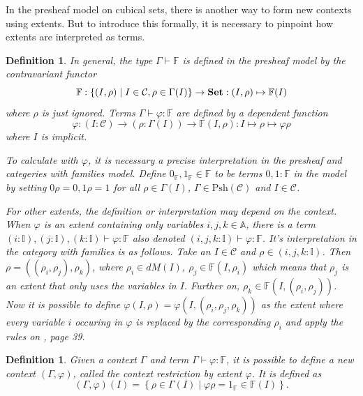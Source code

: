 \documentclass[12pt,a4paper,twoside,xetex]{book}
\newcommand{\keyword}[1]{\emph{#1}\index{#1}}
\newtheorem{definition}[theorem]{Definition}
\newcommand{\Psh}[1]{\text{Psh}\left(#1\right)}
\begin{document}
In the presheaf model on cubical sets, there is another way to form new 
contexts using extents. But to introduce this formally, it is necessary to 
pinpoint how extents are interpreted as terms.

\begin{definition}
In general, the type $\Gamma \vdash \mathbb{F}$ is defined in the presheaf 
model by the contravariant functor $$\mathbb{F} : \left\{ (I, \rho) \mid  I \in 
\mathcal{C},  \rho \in \Gamma (I) \right\} \rightarrow \text{\textbf{Set}}: (I, \rho) \mapsto 
\mathbb{F}(I)$$ where $\rho$ is just ignored. Terms $\Gamma \vdash \varphi : 
\mathbb{F}$ are defined by a dependent function $$\varphi : (I : \mathcal{C}) 
\rightarrow (\rho : \Gamma (I)) \rightarrow  \mathbb{F}(I,\rho): I \mapsto \rho 
\mapsto \varphi \rho $$ where $I$ is implicit.

To calculate with $\varphi$, it is necessary a precise interpretation in the 
presheaf and categeries with families model. Define $ 0_{\mathbb{F}}, 
1_{\mathbb{F}} \in \mathbb{F}$ to be terms $0,1 : \mathbb{F}$ in the model by 
setting \(0 \rho = 0, 1 \rho = 1\) for all $\rho \in \Gamma (I)$, $\Gamma \in 
\Psh{\mathcal{C}}$ and $I \in \mathcal{C}$.  

For other extents, the definition or interpretation may depend on the context. 
When $\varphi$ is an extent containing only variables $i,j,k \in \mathbb{A}$, 
there is a term $(i: \mathbb{I}), (j: \mathbb{I}), (k: \mathbb{I}) \vdash 
\varphi : \mathbb{F}$ also denoted $(i,j,k: \mathbb{I}) \vdash \varphi : 
\mathbb{F}$. It's interpretation in the category with families is as follows. 
Take an $I \in \mathcal{C}$ and  $\rho \in (i,j,k: \mathbb{I})$. Then $\rho = 
((\rho_i, \rho_j), \rho_k)$, where $\rho_i \in dM(I)$, $\rho_j \in 
\mathbb{F}(I,\rho_i)$ which means that $\rho_j$ is an extent that only uses the 
variables in $I$. Further on, $\rho_k \in \mathbb{F}(I, (\rho_i, \rho_j))$. Now 
it is possible to define $\varphi(I,\rho)=\varphi(I,(\rho_i,\rho_j,\rho_k))$ as 
the extent where every variable $i$ occuring in $\varphi$ is replaced by the 
corresponding $\rho_i$ and apply the rules on \cite{Orton2019}, page 39.
\end{definition}



\begin{definition}\label{contextrestriction}
Given a context $\Gamma$ and term $\Gamma \vdash \varphi : \mathbb{F}$, it is 
possible to define a new context $(\Gamma , \varphi)$, called the 
\keyword{context restriction by extent $\varphi$}. It is defined as  $$(\Gamma 
, \varphi)(I) = \left\{ \rho \in \Gamma (I) \mid \varphi \rho = 1_{\mathbb{F}} 
\in \mathbb{F}(I) \right \} .$$
\end{definition}
 
\end{document}
